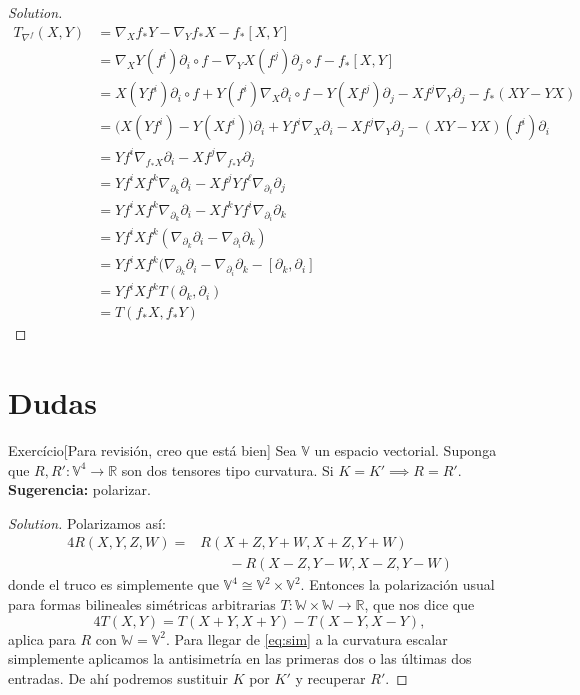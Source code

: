 \begin{proof}[Solution]

\begin{align*}
	T_{\nabla^f}(X,Y)&=\nabla_X f_*Y-\nabla_Yf_*X-f_*[X,Y]\\
			 &=\nabla_XY(f^i)\partial_i \circ f-\nabla_YX(f^j)\partial_j\circ f-f_*[X,Y]\\
			 &=X(Yf^i)\partial_i \circ f+Y(f^i)\nabla_X\partial_i \circ f-Y(Xf^j)\partial_j-Xf^j \nabla_Y \partial_j-f_*(XY-YX)\\
			 &=\Big(X(Yf^i)-Y(Xf^i)\Big)\partial_i+Yf^i\nabla_X\partial_i-Xf^j\nabla_Y\partial_j-(XY-YX)(f^i)\partial_i\\
			 &=Yf^i \nabla_{f_*X}\partial_i-Xf^j \nabla_{f_*Y}\partial_j\\
&=Yf^iXf^k\nabla_{\partial_k}\partial_i-Xf^jYf^\ell \nabla_{\partial_\ell}\partial_j\\
&=Yf^iXf^k \nabla_{\partial_k}\partial_i-Xf^kYf^i \nabla_{\partial_i}\partial_k\\
&=Yf^iXf^k(\nabla_{\partial_k}\partial_i-\nabla_{\partial_i}\partial_k)\\
&=Yf^iXf^k(\nabla_{\partial_k}\partial_i-\nabla_{\partial_i}\partial_k-[\partial_k,\partial_i]\\
&=Yf^iXf^kT(\partial_k,\partial_i)\\
&=T(f_*X,f_*Y)
\end{align*}
\end{proof}

\clearpage

\section{Dudas}

\begin{thing6}{Exercício}[Para revisión, creo que está bien]\leavevmode
	Sea \(\mathbb{V}\) un espacio vectorial. Suponga que \(R,R':\mathbb{V}^4\to \mathbb{R}\) son dos tensores tipo curvatura. Si \(K=K' \implies R=R'\). \textbf{Sugerencia:} polarizar. 
\end{thing6}
\begin{proof}[Solution]\leavevmode
Polarizamos así:
\begin{equation}\label{eq:sim}\begin{aligned}4R(X,Y,Z,W)=&R(X+Z,Y+W,X+Z,Y+W)\\&\qquad -R(X-Z,Y-W,X-Z,Y-W)\end{aligned}\end{equation}
donde el truco es simplemente que \(\mathbb{V}^4 \cong\mathbb{V}^2\times\mathbb{V}^2\). Entonces la polarización usual para formas bilineales simétricas arbitrarias \(T: \mathbb{W}\times \mathbb{W}\to \mathbb{R}\), que nos dice que
\[4T(X,Y)=T(X+Y,X+Y)-T(X-Y,X-Y),\]
aplica para \(R\) con \(\mathbb{W}=\mathbb{V}^2\). Para llegar de \cref{eq:sim} a la curvatura escalar simplemente aplicamos la antisimetría en las primeras dos o las últimas dos entradas. De ahí podremos sustituir \(K\) por \(K'\) y recuperar \(R'\).
\end{proof}

